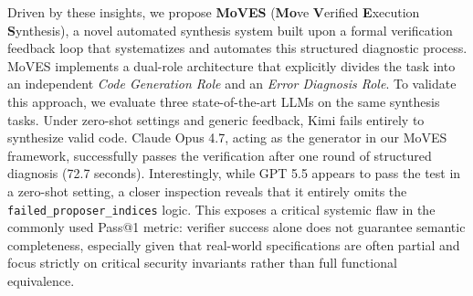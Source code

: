 Driven by these insights, we propose \textbf{MoVES} (\textbf{Mo}ve \textbf{V}erified \textbf{E}xecution \textbf{S}ynthesis), a novel automated synthesis system built upon a formal verification feedback loop that systematizes and automates this structured diagnostic process. MoVES implements a dual-role architecture that explicitly divides the task into an independent \textit{Code Generation Role} and an \textit{Error Diagnosis Role}. To validate this approach, we evaluate three state-of-the-art LLMs on the same synthesis tasks. Under zero-shot settings and generic feedback, Kimi fails entirely to synthesize valid code. Claude Opus 4.7, acting as the generator in our MoVES framework, successfully passes the verification after one round of structured diagnosis (72.7 seconds). Interestingly, while GPT 5.5 appears to pass the test in a zero-shot setting, a closer inspection reveals that it entirely omits the \texttt{failed\_proposer\_indices} logic. This exposes a critical systemic flaw in the commonly used Pass@1 metric: verifier success alone does not guarantee semantic completeness, especially given that real-world specifications are often partial and focus strictly on critical security invariants rather than full functional equivalence.

